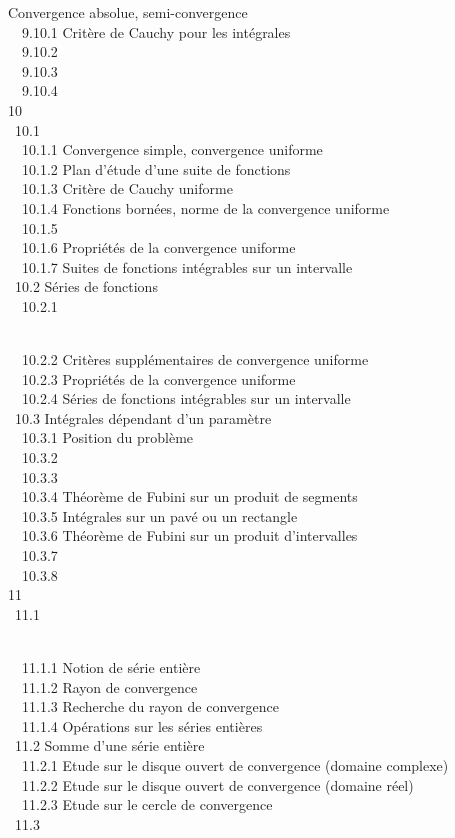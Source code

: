 \documentclass[]{article}
\begin{document}
{Convergence absolue,
semi-convergence} \\ ~~9.10.1
{Critère de Cauchy pour les
intégrales} \\ ~~9.10.2
 \\ ~~9.10.3
 \\
~~9.10.4  \\ 10
 \\
~10.1  \\
~~10.1.1 {Convergence simple,
convergence uniforme} \\ ~~10.1.2
{Plan d'étude d'une suite de
fonctions} \\ ~~10.1.3 {Critère
de Cauchy uniforme} \\ ~~10.1.4
{Fonctions bornées, norme de la
convergence uniforme} \\ ~~10.1.5
 \\
~~10.1.6 {Propriétés de la
convergence uniforme} \\ ~~10.1.7
{Suites de fonctions intégrables
sur un intervalle} \\ ~10.2 {Séries
de fonctions} \\ ~~10.2.1

\\ ~~10.2.2 {Critères
supplémentaires de convergence uniforme} \\ ~~10.2.3
{Propriétés de la convergence
uniforme} \\ ~~10.2.4 {Séries de
fonctions intégrables sur un intervalle} \\ ~10.3
{Intégrales dépendant d'un
paramètre} \\ ~~10.3.1 {Position
du problème} \\ ~~10.3.2
 \\ ~~10.3.3
 \\ ~~10.3.4
{Théorème de Fubini sur un
produit de segments} \\ ~~10.3.5
{Intégrales sur un pavé ou un
rectangle} \\ ~~10.3.6 {Théorème
de Fubini sur un produit d'intervalles} \\ ~~10.3.7
 \\ ~~10.3.8
 \\ 11
 \\ ~11.1

\\ ~~11.1.1 {Notion de série
entière} \\ ~~11.1.2 {Rayon de
convergence} \\ ~~11.1.3
{Recherche du rayon de
convergence} \\ ~~11.1.4
{Opérations sur les séries
entières} \\ ~11.2 {Somme d'une
série entière} \\ ~~11.2.1 {Etude
sur le disque ouvert de convergence (domaine complexe)} \\ ~~11.2.2
{Etude sur le disque ouvert de
convergence (domaine réel)} \\ ~~11.2.3
{Etude sur le cercle de
convergence} \\ ~11.3
\end{document}
